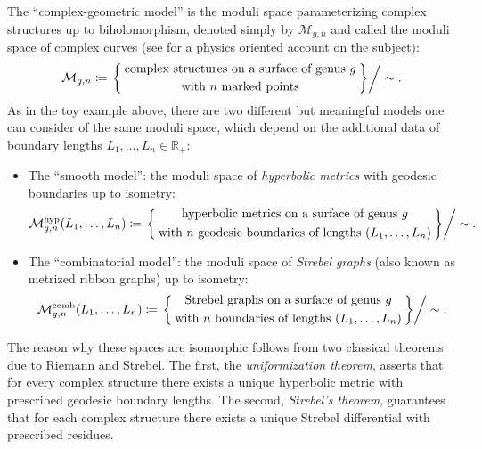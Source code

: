 \documentclass[a4paper,11pt,english]{article}
\theoremstyle{plain}
\theoremstyle{definition}
\theoremstyle{plain}
\newcommand{\R}{\mathbb{R}}
\newcommand{\M}{\mathcal{M}}
\begin{document}
The ``complex-geometric model'' is the moduli space parameterizing complex structures up to biholomorphism, denoted simply by $\M_{g,n}$ and called the moduli space of complex curves (see \cite{GL26} for a physics oriented account on the subject):
\begin{equation}
    \M_{g,n}
    \coloneqq
    \left.
    \Set{\substack{
        \displaystyle\text{complex structures on a surface of genus $g$} \\[1ex]
        \displaystyle\text{with $n$ marked points}
    }}
    \right/ \sim.
\end{equation}
As in the toy example above, there are two different but meaningful models one can consider of the same moduli space, which depend on the additional data of boundary lengths $L_1,\ldots,L_n \in \R_+$:
\begin{itemize}
    \item The ``smooth model'': the moduli space of \emph{hyperbolic metrics} with geodesic boundaries up to isometry:
    \begin{equation}
        \M_{g,n}^{\textup{hyp}}(L_1,\ldots,L_n)
        \coloneqq
        \left.
        \Set{\substack{
            \displaystyle\text{hyperbolic metrics on a surface of genus $g$} \\[1ex]
            \displaystyle\text{with $n$ geodesic boundaries of lengths $(L_1,\ldots,L_n)$}
        }}
        \right/ \sim.
    \end{equation}

    \item The ``combinatorial model'': the moduli space of \emph{Strebel graphs} (also known as metrized ribbon graphs) up to isometry:
    \begin{equation}
        \M_{g,n}^{\textup{comb}}(L_1,\ldots,L_n)
        \coloneqq
        \left.
        \Set{\substack{
            \displaystyle\text{Strebel graphs on a surface of genus $g$} \\[1ex]
            \displaystyle\text{with $n$ boundaries of lengths $(L_1,\ldots,L_n)$}
        }}
        \right/ \sim.
    \end{equation}
\end{itemize}
The reason why these spaces are isomorphic follows from two classical theorems due to Riemann and Strebel. The first, the \emph{uniformization theorem}, asserts that for every complex structure there exists a unique hyperbolic metric with prescribed geodesic boundary lengths. The second, \emph{Strebel's theorem}, guarantees that for each complex structure there exists a unique Strebel differential with prescribed residues.
\end{document}

